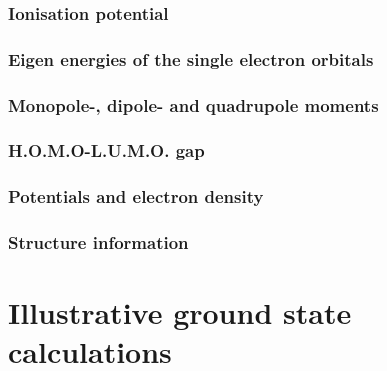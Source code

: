 \documentclass[11pt,a4paper]{article}
\begin{document}
			\subsubsection{Ionisation potential}
			\subsubsection{Eigen energies of the single electron orbitals}
			\subsubsection{Monopole-, dipole- and quadrupole moments}
			\subsubsection{H.O.M.O-L.U.M.O. gap}
			\subsubsection{Potentials and electron density}
			\subsubsection{Structure information}

	\section{Illustrative ground state calculations}
\end{document}
